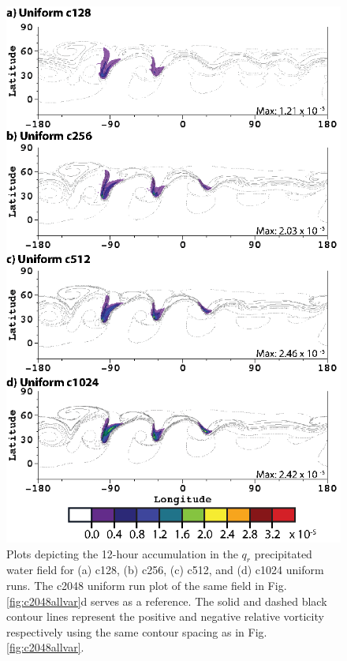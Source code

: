 \documentclass{ametsoc}
\begin{document}
\begin{figure}
   \centerline{%
   \noindent
   \includegraphics[height=.9\textheight]{Figures/A_qrdt_uniform-01}}
   \caption{Plots depicting the 12-hour accumulation in the $q_r$ precipitated water field for
   (a) c128, (b) c256, (c) c512, and (d) c1024 uniform runs. The c2048 uniform run
   plot of the same field in Fig. \ref{fig:c2048allvar}d serves as a reference.
   The solid and dashed black contour
   lines represent the positive and negative relative vorticity respectively using the
   same contour spacing as in Fig. \ref{fig:c2048allvar}.
      }
   \label{fig:uniformqrdt}
\end{figure}
\end{document}
